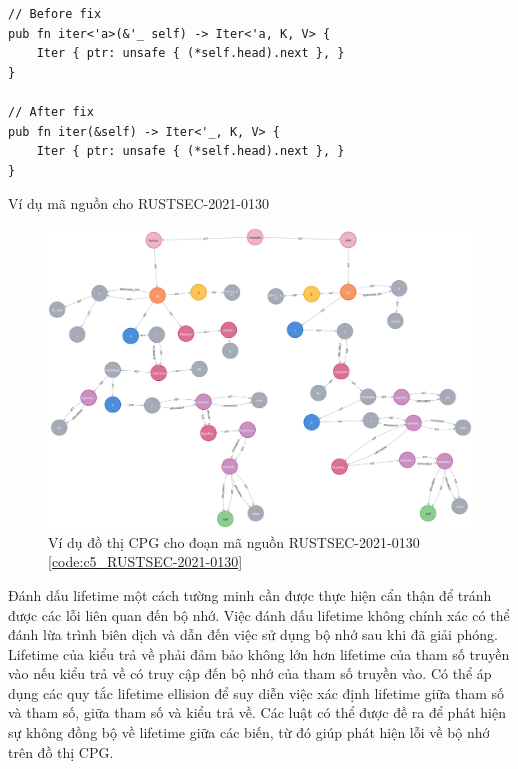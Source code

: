 \begin{listing}[H]
\begin{verbatim}
// Before fix
pub fn iter<'a>(&'_ self) -> Iter<'a, K, V> {
    Iter { ptr: unsafe { (*self.head).next }, }
}

// After fix
pub fn iter(&self) -> Iter<'_, K, V> {
    Iter { ptr: unsafe { (*self.head).next }, }
}
\end{verbatim}
\caption{Ví dụ mã nguồn cho RUSTSEC-2021-0130}
\label{code:c5_RUSTSEC-2021-0130}
\end{listing}

\begin{figure}[H]
    \includegraphics[width=1\columnwidth]{figures/c5/c5_RUSTSEC-2021-0130.png}
    \centering
    \caption{Ví dụ đồ thị CPG cho đoạn mã nguồn RUSTSEC-2021-0130 \ref{code:c5_RUSTSEC-2021-0130}}
    \label{img:c5_RUSTSEC-2021-0130}
\end{figure}

Đánh dấu lifetime một cách tường minh cần được thực hiện cẩn thận để tránh được các lỗi liên quan đến bộ nhớ.
Việc đánh dấu lifetime không chính xác có thể đánh lừa trình biên dịch và dẫn đến việc sử dụng bộ nhớ sau khi đã giải phóng.
Lifetime của kiểu trả về phải đảm bảo không lớn hơn lifetime của tham số truyền vào nếu kiểu trả về có truy cập đến bộ nhớ của tham số truyền vào.
Có thể áp dụng các quy tắc lifetime ellision để suy diễn việc xác định lifetime giữa tham số và tham số, giữa tham số và kiểu trả về.
Các luật có thể được đề ra để phát hiện sự không đồng bộ về lifetime giữa các biến, từ đó giúp phát hiện lỗi về bộ nhớ trên đồ thị CPG.
